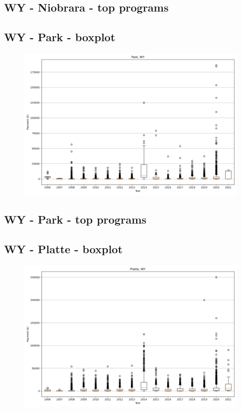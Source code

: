 \subsection*{WY - Niobrara - top programs}

\newpage
\subsection*{WY - Park - boxplot}
\begin{figure}[h]
\centering
\includegraphics[width=7in]{../output/boxplots/counties/Park-WY_boxplot.png}
\end{figure}


\subsection*{WY - Park - top programs}

\newpage
\subsection*{WY - Platte - boxplot}
\begin{figure}[h]
\centering
\includegraphics[width=7in]{../output/boxplots/counties/Platte-WY_boxplot.png}
\end{figure}


